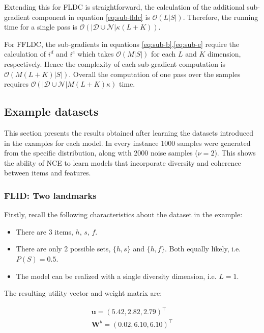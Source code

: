 Extending this for FLDC is straightforward, the calculation of the additional sub-gradient component in equation \ref{eq:sub-fldc} is $\mathcal{O}(L|S|)$. Therefore, the running time for a single pass is $\mathcal{O}(|\mathcal{D}\cup\mathcal{N}|\kappa(L+K))$.

For FFLDC, the sub-gradients in equations \ref{eq:sub-b},\ref{eq:sub-e} require the calculation of $i^{d}$ and $i^{e}$ which takes $\mathcal{O}(M|S|)$ for each $L$ and $K$ dimension, respectively. Hence the complexity of each sub-gradient computation is $\mathcal{O}(M(L+K)|S|)$. Overall the computation of one pass over the samples requires $\mathcal{O}(|\mathcal{D}\cup\mathcal{N}|M(L+K)\kappa)$ time.

\subsection{Example datasets}

This section presents the results obtained after learning the datasets introduced in the examples for each model. In every instance 1000 samples were generated from the specific distribution, along with 2000 noise samples ($\nu = 2$). This shows the ability of NCE to learn models that incorporate diversity and coherence between items and features.

\subsubsection{FLID: Two landmarks}

Firstly, recall the following characteristics about the dataset in the example:

\begin{itemize}
  \item There are 3 items, $h$, $s$, $f$.
  \item There are only 2 possible sets, $\{h,s\}$ and $\{h,f\}$. Both equally likely, i.e. $P(S) = 0.5$.
  \item The model can be realized with a single diversity dimension, i.e. $L=1$.
\end{itemize}

The resulting utility vector and weight matrix are:

\begin{align*}
  \mathbf{u} = \left(5.42,2.82,2.79\right)^{\intercal} \\
  \mathbf{W}^{b} = \left(0.02, 6.10, 6.10\right)^{\intercal}
\end{align*}

